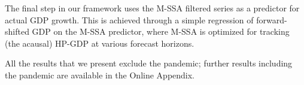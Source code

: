 \documentclass[11pt,a4paper]{article}
\begin{document}



The final step in our framework uses the M-SSA filtered series as a predictor for actual GDP growth. This is achieved through a simple regression of forward-shifted GDP on the M-SSA predictor, where M-SSA is optimized for tracking (the acausal) HP-GDP at various forecast horizons. 


All the results that we present exclude the pandemic; further results including the pandemic are available in the Online Appendix.\\



\end{document}
